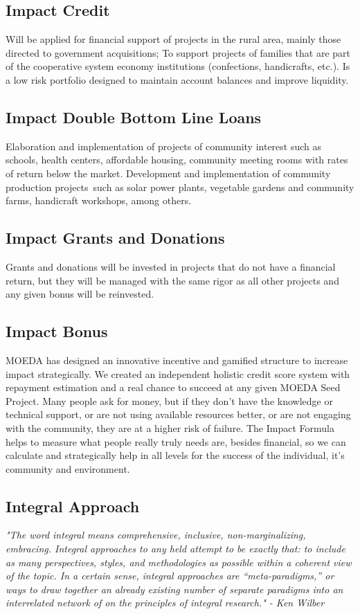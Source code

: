 \documentclass{article}
\begin{document}
\subsection {Impact Credit}

Will be applied for financial support of projects in the rural area, mainly those directed to government acquisitions; To support projects of families that are part of the cooperative system economy institutions (confections, handicrafts, etc.). Is a low risk portfolio designed to maintain account balances and improve liquidity.

\subsection {Impact Double Bottom Line Loans}
Elaboration and implementation of projects of community interest such as schools, health centers, affordable housing, community meeting rooms with rates of return below the market. Development and implementation of community production projects such as solar power plants, vegetable gardens and community farms, handicraft workshops, among others.

\subsection {Impact Grants and Donations}
Grants and donations will be invested in projects that do not have a financial return, but they will be managed with the same rigor as all other projects and any given bonus will be reinvested. 

\subsection {Impact Bonus}
MOEDA has designed an innovative incentive and gamified structure to increase impact strategically. We created an independent holistic credit score system with repayment estimation and a real chance to succeed at any given MOEDA Seed Project. Many people ask for money, but if they don't have the knowledge or technical support, or are not using available resources better, or are not engaging with the community, they are at a higher risk of failure. The Impact Formula helps to measure what people really truly needs are, besides financial, so we can calculate and strategically help in all levels for the success of the individual, it's community and environment.

\subsection {Integral Approach}
\textit{
"The word integral means comprehensive, inclusive, non-marginalizing, embracing. Integral approaches to any held attempt to be exactly that: to include as many perspectives, styles, and methodologies as possible within a coherent view of the topic. In a certain sense, integral approaches are “meta-paradigms,” or ways to draw together an already existing number of separate paradigms into an interrelated network of on the principles of integral research." - Ken Wilber}
\end{document}
